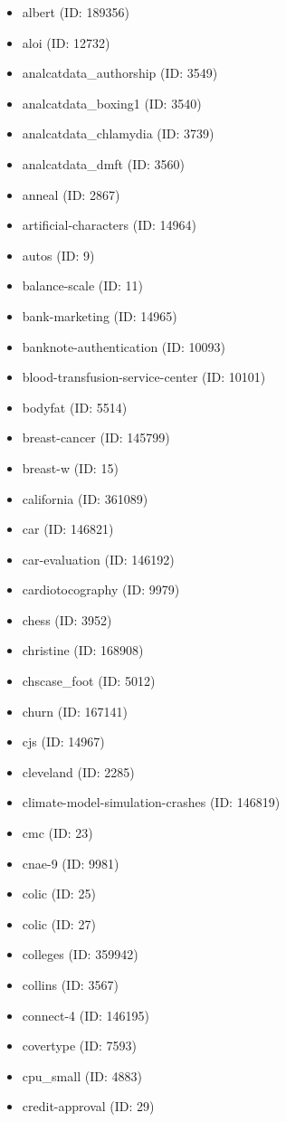 \begin{itemize}
  \item albert (ID: 189356)
  \item aloi (ID: 12732)
  \item analcatdata\_authorship (ID: 3549)
  \item analcatdata\_boxing1 (ID: 3540)
  \item analcatdata\_chlamydia (ID: 3739)
  \item analcatdata\_dmft (ID: 3560)
  \item anneal (ID: 2867)
  \item artificial-characters (ID: 14964)
  \item autos (ID: 9)
  \item balance-scale (ID: 11)
  \item bank-marketing (ID: 14965)
  \item banknote-authentication (ID: 10093)
  \item blood-transfusion-service-center (ID: 10101)
  \item bodyfat (ID: 5514)
  \item breast-cancer (ID: 145799)
  \item breast-w (ID: 15)
  \item california (ID: 361089)
  \item car (ID: 146821)
  \item car-evaluation (ID: 146192)
  \item cardiotocography (ID: 9979)
  \item chess (ID: 3952)
  \item christine (ID: 168908)
  \item chscase\_foot (ID: 5012)
  \item churn (ID: 167141)
  \item cjs (ID: 14967)
  \item cleveland (ID: 2285)
  \item climate-model-simulation-crashes (ID: 146819)
  \item cmc (ID: 23)
  \item cnae-9 (ID: 9981)
  \item colic (ID: 25)
  \item colic (ID: 27)
  \item colleges (ID: 359942)
  \item collins (ID: 3567)
  \item connect-4 (ID: 146195)
  \item covertype (ID: 7593)
  \item cpu\_small (ID: 4883)
  \item credit-approval (ID: 29)

\end{itemize}
